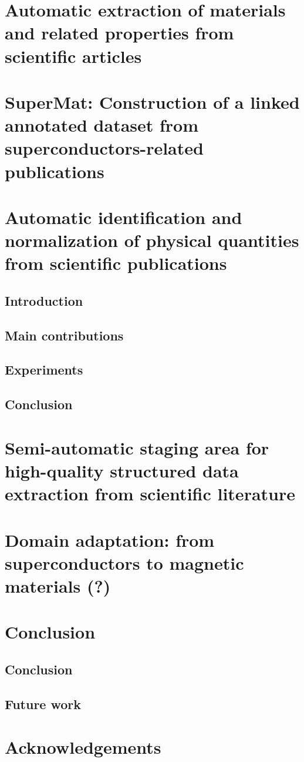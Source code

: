 \documentclass[12pt, a4paper]{report}
\begin{document}
\chapter{Automatic extraction of materials and related properties from scientific articles}

\chapter{SuperMat: Construction of a linked annotated dataset from superconductors-related publications}


\chapter{Automatic identification and normalization of physical quantities from scientific publications}
\section{Introduction}
\section{Main contributions}
\section{Experiments}
\section{Conclusion}

\chapter{Semi-automatic staging area for high-quality structured data extraction from scientific literature}

\chapter{Domain adaptation: from superconductors to magnetic materials (?)}

\chapter{Conclusion}
\section{Conclusion}
\section{Future work}

\chapter*{Acknowledgements}
\newpage



\end{document}
